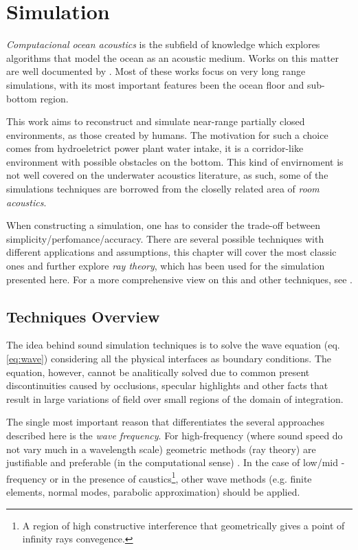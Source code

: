 \section{Simulation}

\textit{Computacional ocean
acoustics} is the subfield of knowledge which explores algorithms that model
the ocean as an acoustic medium. Works on this matter are well documented by
\citet{Etter2013}. Most of these works focus on very long range simulations,
with its most important features been the ocean floor and sub-bottom region.

This work aims to reconstruct and simulate near-range partially closed
environments, as those created by humans. The motivation for such a choice comes
from hydroeletrict power plant water intake, it is a corridor-like environment
with possible obstacles on the bottom. This kind of envirnoment is not well
covered on the underwater acoustics literature, as such, some of the simulations
techniques are borrowed from the closelly related area of \textit{room
acoustics}.

When constructing a simulation, one has to consider the trade-off between
simplicity/perfomance/accuracy. There are several possible techniques with
different applications and assumptions, this chapter will cover the most
classic ones and further explore \textit{ray theory}, which has been used for
the simulation presented here. For a more comprehensive view on this and other
techniques, see \citet{LURTON,jensen2011computational}.

\subsection{Techniques Overview}
\label{ss:simuloverview}

The idea behind sound simulation techniques is to solve the wave
equation (eq. \ref{eq:wave}) considering all the physical interfaces as boundary
conditions. The equation, however, cannot be analitically solved due to common
present discontinuities caused by occlusions, specular highlights and other
facts that result in large variations of field over small regions of the
domain of integration\cite{funkhouser2003survey}.

The single most important reason that differentiates the several approaches
described here is the \textit{wave frequency}. For high-frequency (where sound
speed do not vary much in a wavelength scale) geometric methods (ray theory) are
justifiable and preferable (in the computational sense) \cite{urick1979}. In the
case of low/mid - frequency or in the presence of caustics\footnote{A region of
high constructive interference that geometrically gives a point of infinity
rays convegence.}, other wave methods (e.g. finite elements, normal modes,
parabolic approximation) should be applied.

